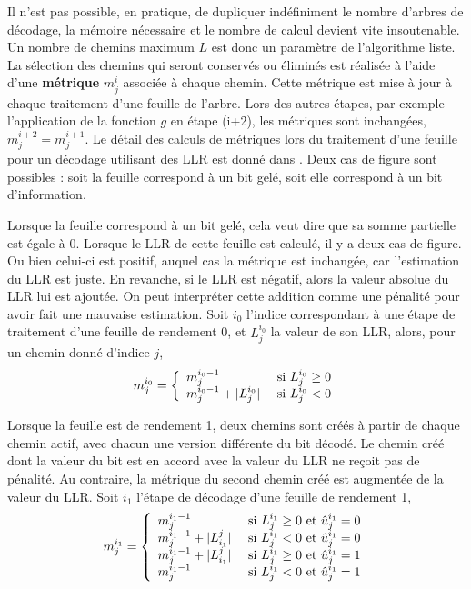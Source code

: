 Il n'est pas possible, en pratique, de dupliquer indéfiniment le nombre d'arbres de décodage, la mémoire nécessaire et le nombre de calcul devient vite insoutenable. Un nombre de chemins maximum $L$ est donc un paramètre de l'algorithme liste. La sélection des chemins qui seront conservés ou éliminés est réalisée à l'aide d'une \textbf{métrique} $m^i_j$ associée à chaque chemin. Cette métrique est mise à jour à chaque traitement d'une feuille de l'arbre. Lors des autres étapes, par exemple l'application de la fonction $g$ en étape (i+2), les métriques sont inchangées, $m^{i+2}_j = m^{i+1}_j$. Le détail des calculs de métriques lors du traitement d'une feuille pour un décodage utilisant des LLR est donné dans \cite{balatsoukas-stimming_llr-based_2015}. Deux cas de figure sont possibles : soit la feuille correspond à un bit gelé, soit elle correspond à un bit d'information.

Lorsque la feuille correspond à un bit gelé, cela veut dire que sa somme partielle est égale à 0. Lorsque le LLR de cette feuille est calculé, il y a deux cas de figure. Ou bien celui-ci est positif, auquel cas la métrique est inchangée, car l'estimation du LLR est juste. 
En revanche, si le LLR est négatif, alors la valeur absolue du LLR lui est ajoutée. On peut interpréter cette addition comme une \og pénalité \fg pour avoir fait une mauvaise estimation. Soit $i_0$ l'indice correspondant à une étape de traitement d'une feuille de rendement 0, et $L_j^{i_0}$ la valeur de son LLR, alors, pour un chemin donné d'indice $j$, 
\begin{equation*}
m^{i_0}_j=\left\{\begin{array}{l c l} m_j^{{i_0}-1} & \text{ si } L_j^{i_0} \geq 0 \\ m_j^{{i_0}-1} + |L_j^{i_0}| & \text{ si } L_j^{i_0} < 0 \end{array}\right.
\end{equation*}

Lorsque la feuille est de rendement 1, deux chemins sont créés à partir de chaque chemin actif, avec chacun une version différente du bit décodé. Le chemin créé dont la valeur du bit est en accord avec la valeur du LLR ne reçoit pas de pénalité. Au contraire, la métrique du second chemin créé est augmentée de la valeur du LLR. Soit $i_1$ l'étape de décodage d'une feuille de rendement 1,
\begin{equation*}
m^{i_1}_j=\left\{\begin{array}{l c l} m_j^{{i_1}-1}               & \text{ si } L^{i_1}_j \geq 0 \text{ et } \hat{u}^{i_1}_j = 0
                                   \\ m_j^{{i_1}-1} + |L^j_{i_1}| & \text{ si } L^{i_1}_j < 0    \text{ et } \hat{u}^{i_1}_j = 0
                                   \\ m_j^{{i_1}-1} + |L^j_{i_1}| & \text{ si } L^{i_1}_j \geq 0 \text{ et } \hat{u}^{i_1}_j = 1
                                   \\ m_j^{{i_1}-1}               & \text{ si } L^{i_1}_j < 0    \text{ et } \hat{u}^{i_1}_j = 1

                \end{array}\right.
\end{equation*}

